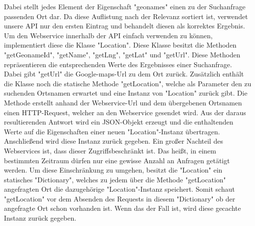 Dabei stellt jedes Element der Eigenschaft "{}geonames"{} einen zu der Suchanfrage passenden Ort dar. Da diese Auflistung nach der Relevanz sortiert ist, verwendet unsere API nur den ersten Eintrag und behandelt diesen als korrektes Ergebnis. Um den Webservice innerhalb der API einfach verwenden zu k\"{o}nnen, implementiert diese die Klasse "{}Location"{}. Diese Klasse besitzt die Methoden "{}getGeonameId"{}, "{}getName"{}, "{}getLng"{}, "{}getLat"{} und "{}getUrl"{}. Diese Methoden repr\"{a}sentieren die entsprechenden Werte des Ergebnisses einer Suchanfrage. Dabei gibt "{}getUrl"{} die Google-maps-Url zu dem Ort zur\"uck. Zus\"atzlich enth\"alt die Klasse noch die statische Methode "{}getLocation"{}, welche als Parameter den zu suchenden Ortsnamen erwartet und eine Instanz von "{}Location"{} zur\"uck gibt. Die Methode erstellt anhand der Webservice-Url und dem \"ubergebenen Ortsnamen einen HTTP-Request, welcher an den Webservice gesendet wird. Aus der daraus resultierenden Antwort wird ein JSON-Objekt erzeugt und die enthaltenden Werte auf die Eigenschaften einer neuen "{}Location"{}-Instanz \"ubertragen. Anschlie{\ss}end wird diese Instanz zur\"uck gegeben. Ein gro{\ss}er Nachteil des Webservices ist, dass dieser Zugriffsbeschr\"{a}nkt ist. Das hei{\ss}t, in einem bestimmten Zeitraum d\"urfen nur eine gewisse Anzahl an Anfragen get\"{a}tigt werden. Um diese Einschr\"{a}nkung zu umgehen, besitzt die "{}Location"{} ein statisches "{}Dictionary"{}, welches zu jedem \"uber die Methode "{}getLocation"{} angefragten Ort die dazugeh\"orige "{}Location"{}-Instanz speichert. Somit schaut "{}getLocation"{} vor dem Absenden des Requests in diesem "{}Dictionary"{} ob der angefragte Ort schon vorhanden ist. Wenn das der Fall ist, wird diese gecachte Instanz zur\"uck gegeben.

